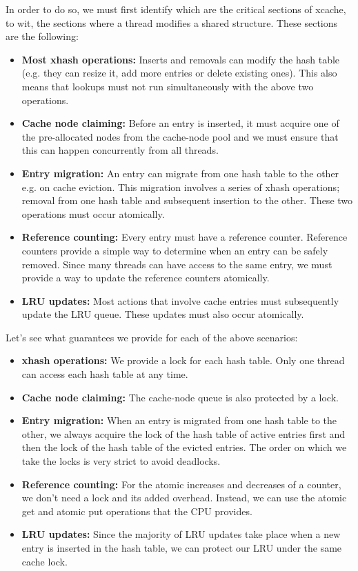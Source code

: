 In order to do so, we must first identify which are the critical sections of 
xcache, to wit, the sections where a thread modifies a shared structure. These 
sections are the following:

\begin{itemize}
	\item
		\textbf{Most xhash operations:} Inserts and removals can modify 
		the hash table (e.g. they can resize it, add more entries or 
		delete existing ones). This also means that lookups must not 
		run simultaneously with the above two operations.
	\item
		\textbf{Cache node claiming:} Before an entry is inserted, it 
		must	acquire one of the pre-allocated nodes from the 
		cache-node pool and we must ensure that this can happen 
		concurrently from all threads.
	\item
		\textbf{Entry migration:} An entry can migrate from one hash 
		table to the other e.g. on cache eviction. This migration 
		involves a series of xhash operations; removal from one hash 
		table and subsequent insertion to the other. These two 
		operations must occur atomically.
	\item
		\textbf{Reference counting:} Every entry must have a reference 
		counter.  Reference counters provide a simple way to determine 
		when an entry can be safely removed. Since many threads can 
		have access to the same entry, we must provide a way to update 
		the reference counters atomically.
	\item
		\textbf{LRU updates:} Most actions that involve cache entries 
		must subsequently update the LRU queue. These updates must also 
		occur atomically.
\end{itemize}

Let's see what guarantees we provide for each of the above scenarios:

\begin{itemize}
	\item
		\textbf{xhash operations:} We provide a lock for each hash 
		table. Only one thread can access each hash table at any time.
	\item
		\textbf{Cache node claiming:} The cache-node queue is also 
		protected by a lock.
	\item
		\textbf{Entry migration:} When an entry is migrated from one 
		hash table to the other, we always acquire the lock of the hash 
		table of active entries first and then the lock of the hash 
		table of the evicted entries. The order on which we take the 
		locks is very strict to avoid deadlocks.
	\item
		\textbf{Reference counting:} For the atomic increases and 
		decreases of a counter, we don't need a lock and its added 
		overhead. Instead, we can use the atomic get and atomic put 
		operations that the CPU provides.
	\item
		\textbf{LRU updates:} Since the majority of LRU updates take
		place when a new entry is inserted in the hash table, we can 
		protect our LRU under the same cache lock.
\end{itemize}

